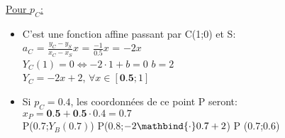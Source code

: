 \documentclass[10pt]{article}
\begin{document}
\begin{minipage}{.43\textwidth}

        \hspace{.5cm} \uline{Pour $p_{C}$:} \\[.125cm]

        \begin{itemize}

                \item C'est une fonction affine passant par C(1;0) et S: \\[.125cm]

                        \hspace{.5cm} $a_{C}$ = $\frac{y_{C} - y_{S}}{x_{C} - x_{S}}x$ = $\frac{-1}{0.5}x$ = $-2x$ \\[.25cm]


                        \hspace{.5cm} $Y_{C}(1) = 0 \Leftrightarrow -2\cdot 1 + b = 0$ \Leftrightarrow $b = 2$ \\[.25cm]

                        \hspace{1.5cm} $Y_{C} = -2x + 2$, $\forall x \in [\textbf{0.5};1]$ \\[.25cm]

        \end{itemize}

        \begin{itemize}

                \item Si $p_{C} = 0.4$, les coordonnées de ce point P seront: \\[.125cm]

                $x_{P} = \textbf{0.5} + \textbf{0.5}\cdot 0.4 = 0.7$ \\[.125cm]

                P(0.7;$Y_{B}(0.7)$) \Leftrightarrow  P(0.8;$-2\mathbind{\cdot}0.7 + 2$) \Leftrightarrow P (0.7;0.6) 

        \end{itemize}

\end{minipage}%
\end{document}
